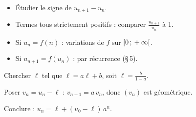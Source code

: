 \begin{paire}
\begin{methode}
\begin{itemize}
  \item Étudier le signe de $u_{n+1}-u_n$.
  \item Termes tous strictement positifs : comparer $\frac{u_{n+1}}{u_n}$ à $1$.
  \item Si $u_n=f(n)$ : variations de $f$ sur $\mathopen{[}0\,{;}\,+\infty\mathclose{[}$.
  \item Si $u_{n+1}=f(u_n)$ : par récurrence (§\,5).
\end{itemize}
\end{methode}
\begin{methode}[Suite $u_{n+1}=a\,u_n+b$, avec $a\neq1$]
\begin{etapes}
  \item Chercher $\ell$ tel que $\ell=a\ell+b$, soit $\ell=\frac{b}{1-a}$.
  \item Poser $v_n=u_n-\ell$ : $v_{n+1}=a\,v_n$, donc $(v_n)$ est géométrique.
  \item Conclure : $u_n=\ell+(u_0-\ell)\,a^{n}$.
\end{etapes}
\end{methode}
\end{paire}


